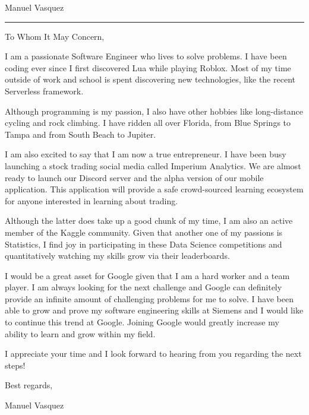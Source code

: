 \documentclass{article}
\newcommand{\position}{I am writing to apply for the \_ position.}
\newcommand{\company}{Google}
\newcommand{\name}{Manuel Vasquez}
\begin{document}
\begin{minipage}[t]{.69\linewidth}
    \begin{center}
        \Huge \name
    \end{center}
    \vspace*{1.89cm}
    \hrule
    \vspace*{.49cm}

    To Whom It May Concern,
    \vspace*{.49cm}

    \raggedright


    I am a passionate Software Engineer who lives to solve problems. I have been coding ever since I first discovered Lua while playing Roblox. Most of my time outside of work and school is spent discovering new technologies, like the recent Serverless framework.
    \vspace*{.49cm}

    Although programming is my passion, I also have other hobbies like long-distance cycling and rock climbing. I have ridden all over Florida, from Blue Springs to Tampa and from South Beach to Jupiter.
    \vspace*{.49cm}

    I am also excited to say that I am now a true entrepreneur. I have been busy launching a stock trading social media called Imperium Analytics. We are almost ready to launch our Discord server and the alpha version of our mobile application. This application will provide a safe crowd-sourced learning ecosystem for anyone interested in learning about trading.
    \vspace*{.49cm}

    Although the latter does take up a good chunk of my time, I am also an active member of the Kaggle community. Given that another one of my passions is Statistics, I find joy in participating in these Data Science competitions and quantitatively watching my skills grow via their leaderboards.
    \vspace*{.49cm}

    I would be a great asset for \company $ $ given that I am a hard worker and a team player. I am always looking for the next challenge and \company $ $ can definitely provide an infinite amount of challenging problems for me to solve. I have been able to grow and prove my software engineering skills at Siemens and I would like to continue this trend at \company. Joining \company $ $ would greatly increase my ability to learn and grow within my field. 
    \vspace*{.49cm}

    I appreciate your time and I look forward to hearing from you regarding the next steps!
    \vspace*{1cm}

    Best regards,
    \vspace*{.49cm}

    \name
\end{minipage}
\end{document}
